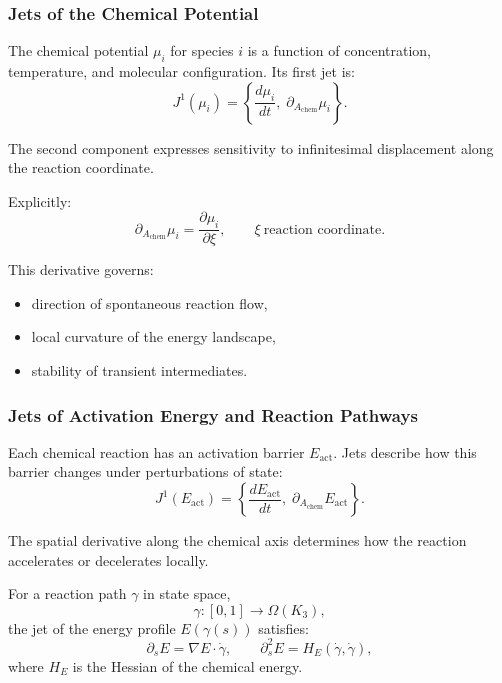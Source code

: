 \subsubsection{Jets of the Chemical Potential}

The chemical potential $\mu_i$ for species $i$ is a function of
concentration, temperature, and molecular configuration. Its first jet is:
\[
J^1(\mu_i) = 
\left\{
\frac{d\mu_i}{dt},\;
\partial_{A_{\mathrm{chem}}}\mu_i
\right\}.
\]

The second component expresses sensitivity to infinitesimal displacement
along the reaction coordinate.

Explicitly:
\[
\partial_{A_{\mathrm{chem}}}\mu_i
= 
\frac{\partial \mu_i}{\partial \xi},
\qquad
\xi\ \text{reaction coordinate}.
\]

This derivative governs:

\begin{itemize}
    \item direction of spontaneous reaction flow,
    \item local curvature of the energy landscape,
    \item stability of transient intermediates.
\end{itemize}



\subsubsection{Jets of Activation Energy and Reaction Pathways}

Each chemical reaction has an activation barrier $E_{\mathrm{act}}$.
Jets describe how this barrier changes under perturbations of state:
\[
J^1(E_{\mathrm{act}}) =
\left\{
\frac{dE_{\mathrm{act}}}{dt},\;
\partial_{A_{\mathrm{chem}}}E_{\mathrm{act}}
\right\}.
\]

The spatial derivative along the chemical axis determines how the
reaction accelerates or decelerates locally.

For a reaction path $\gamma$ in state space,
\[
\gamma: [0,1] \to \Omega(K_3),
\]
the jet of the energy profile $E(\gamma(s))$ satisfies:
\[
\partial_s E = \nabla E \cdot \dot{\gamma},
\qquad
\partial_s^2 E = H_E(\dot{\gamma},\dot{\gamma}),
\]
where $H_E$ is the Hessian of the chemical energy.


